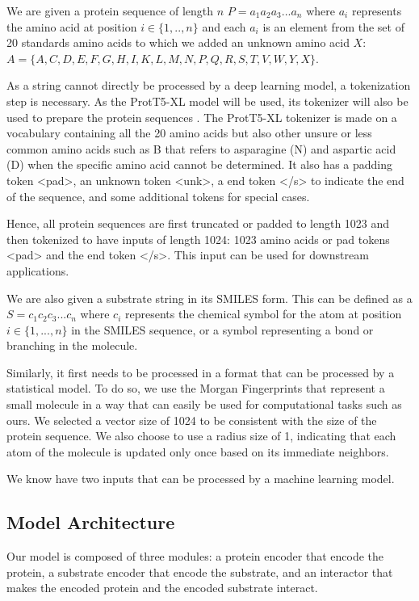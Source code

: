 We are given a protein sequence of length $n$ $P=a_1a_2a_3...a_n$ where $a_i$ represents the amino acid
at position $i\in\{1,..,n\}$ and each $a_i$ is an element from the set of 20 standards amino acids to
which we added an unknown amino acid $X$: $A=\{A,C,D,E,F,G,H,I,K,L,M,N,P,Q,R,S,T,V,W,Y,X\}$.

As a string cannot directly be processed by a deep learning model, a tokenization step is necessary. As
the ProtT5-XL model will be used, its tokenizer will also be used to prepare the protein sequences \cite{prottrans}.
The ProtT5-XL tokenizer is made on a vocabulary containing all the 20 amino acids but also other unsure or less
common amino acids such as B that refers to asparagine (N) and aspartic acid (D) when the specific
amino acid cannot be determined. It also has a padding token <pad>, an unknown token <unk>, a end
token </s> to indicate the end of the sequence, and some additional tokens for special cases.

Hence, all protein sequences are first truncated or padded to length 1023 and then tokenized to have inputs of
length 1024: 1023 amino acids or pad tokens <pad> and the end token </s>. This input can be used for downstream
applications.

We are also given a substrate string in its SMILES form. This can be defined as a $S=c_1c_2c_3...c_n$
where $c_i$ represents the chemical symbol for the atom at position $i\in\{1,...,n\}$ in the SMILES
sequence, or a symbol representing a bond or branching in the molecule.

Similarly, it first needs to be processed in a format that can be processed by a statistical model. To do so,
we use the Morgan Fingerprints that represent a small molecule in a way that can easily be used for computational
tasks such as ours. We selected a vector size of 1024 to be consistent with the size of the protein sequence. We
also choose to use a radius size of 1, indicating that each atom of the molecule is updated only once based on its
immediate neighbors.

We know have two inputs that can be processed by a machine learning model.

\subsection{Model Architecture}

Our model is composed of three modules: a protein encoder that encode the protein, a substrate encoder that
encode the substrate, and an interactor that makes the encoded protein and the encoded substrate interact.

